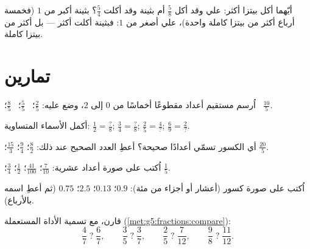 \begin{example}\label{ex:g5:fractions:compare}
أيّهما أكل بيتزا أكثر: علي وقد أكل $\frac58$ أم بثينة وقد أكلت
$\frac54$؟  بثينة أكبر من $1$ (فخمسة أرباع أكثر من بيتزا
كاملة واحدة)،  علي أصغر من $1$: فبثينة أكلت أكثر --- بل
أكثر من بيتزا كاملة.
\end{example}

\section{تمارين}

\begin{exercise}[$\star$]\label{exo:g5:fractions:1}
اُرسم مستقيم أعداد مقطوعًا أخماسًا من $0$ إلى $2$، وضع عليه:
$\frac25$؛ \ $\frac55$؛ \ $\frac85$؛ \ $\frac{10}{5}$.
\end{exercise}

\begin{exercise}[$\star$]\label{exo:g5:fractions:2}
أكمل الأسماء المتساوية:
$\frac12 = \frac{?}{8}$; \quad
$\frac34 = \frac{?}{8}$; \quad
$\frac{2}{5} = \frac{4}{?}$; \quad
$\frac{6}{9} = \frac{2}{?}$.
\end{exercise}

\begin{exercise}[$\star$]\label{exo:g5:fractions:3}
أي الكسور تسمّي أعدادًا صحيحة؟ أعطِ العدد الصحيح عند ذلك:
$\frac82$؛ \quad $\frac{9}{4}$؛ \quad $\frac{15}{3}$؛ \quad
$\frac{20}{5}$.
\end{exercise}

\begin{exercise}[$\star$]\label{exo:g5:fractions:4}
اُكتب على صورة أعداد عشرية: $\frac{7}{10}$؛ \quad $\frac{41}{100}$؛ \quad
$\frac12$؛ \quad $\frac34$؛ \quad $\frac15$.
\end{exercise}

\begin{exercise}[$\star$]\label{exo:g5:fractions:5}
اُكتب على صورة كسور (أعشار أو أجزاء من مئة): $0.9$؛ \quad $0.13$؛
\quad $2.5$؛ \quad $0.75$ (ثم أعطِ اسمه بالأرباع).
\end{exercise}

\begin{exercise}[$\star$]\label{exo:g5:fractions:6}
قارن، مع تسمية الأداة المستعملة
(\cref{met:g5:fractions:compare}):
\[
\frac47 \;?\; \frac67, \qquad
\frac35 \;?\; \frac37, \qquad
\frac25 \;?\; \frac{7}{12}, \qquad
\frac98 \;?\; \frac{11}{12} .
\]
\end{exercise}

